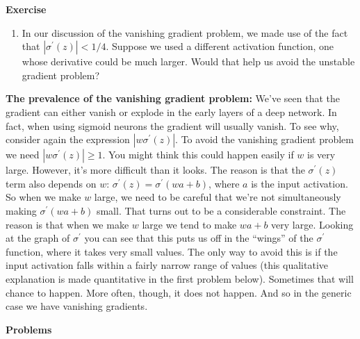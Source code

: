 \textbf{Exercise}


\begin{enumerate}
    \item In our discussion of the vanishing gradient problem, we made use of the fact that $\left|\sigma^{\prime}(z)\right|<1 / 4$. Suppose we used a different activation function, one whose derivative could be much larger. Would that help us avoid the unstable gradient problem? 
    
\end{enumerate}

\textbf{The prevalence of the vanishing gradient problem:} We've seen that the gradient can either vanish or explode in the early layers of a deep network. In fact, when using sigmoid neurons the gradient will usually vanish. To see why, consider again the expression $\left|w \sigma^{\prime}(z)\right|$. To avoid the vanishing gradient problem we need $\left|w \sigma^{\prime}(z)\right| \geq 1$. You might think this could happen easily if $w$ is very large. However, it's more difficult than it looks. The reason is that the $\sigma^{\prime}(z)$ term also depends on $w$:
$\sigma^{\prime}(z)=\sigma^{\prime}(w a+b)$, where $a$ is the input activation. So when we make $w$ large, we need to be careful that we're not simultaneously making $\sigma^{\prime}(w a+b)$ small. That turns out to be a considerable constraint. The reason is that when we make $w$ large we tend to make $wa+b$ very large. Looking at the graph of $\sigma^\prime$ you can see that this puts us off in the ``wings'' of the $\sigma^\prime$ function, where it takes very small values. The only way to avoid this is if the input activation falls within a fairly narrow range of values (this qualitative explanation is made quantitative in the first problem below). Sometimes that will chance to happen. More often, though, it does not happen. And so in the generic case we have vanishing gradients.

\textbf{Problems}



